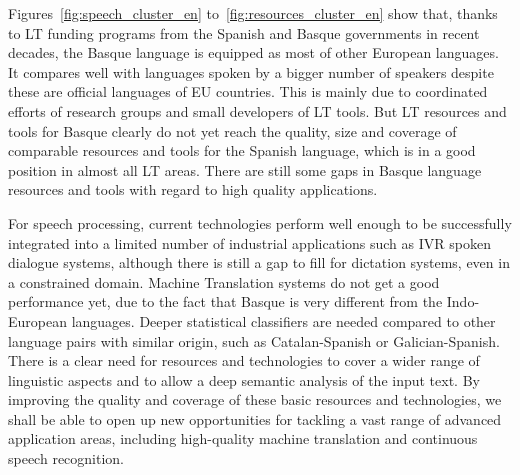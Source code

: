\begin{multicols}{2}
    
Figures~\ref{fig:speech_cluster_en} to~\ref{fig:resources_cluster_en} show that, thanks to LT funding programs from the Spanish and Basque governments in recent decades, the Basque language is equipped as most of other European languages. It compares well with languages spoken by a bigger number of speakers despite these are official languages of EU countries. This is mainly due to coordinated efforts of research groups and small developers of LT tools. But LT resources and tools for Basque clearly do not yet reach the quality, size and coverage of comparable resources and tools for the Spanish language, which is in a good position in almost all LT areas. There are still some gaps in Basque language resources and tools with regard to high quality applications. 

    For speech processing, current technologies perform well enough to be successfully integrated into a limited number of industrial applications such as IVR spoken dialogue systems, although there is still a gap to fill for dictation systems, even in a constrained domain. Machine Translation systems do not get a good performance yet, due to the fact that Basque is very different from the Indo-European languages. Deeper statistical classifiers are needed compared to other language pairs with similar origin, such as Catalan-Spanish or Galician-Spanish. There is a clear need for resources and technologies to cover a wider range of linguistic aspects and to allow a deep semantic analysis of the input text. By improving the quality and coverage of these basic resources and technologies, we shall be able to open up new opportunities for tackling a vast range of advanced application areas, including high-quality machine translation and continuous speech recognition.  


\end{multicols}

